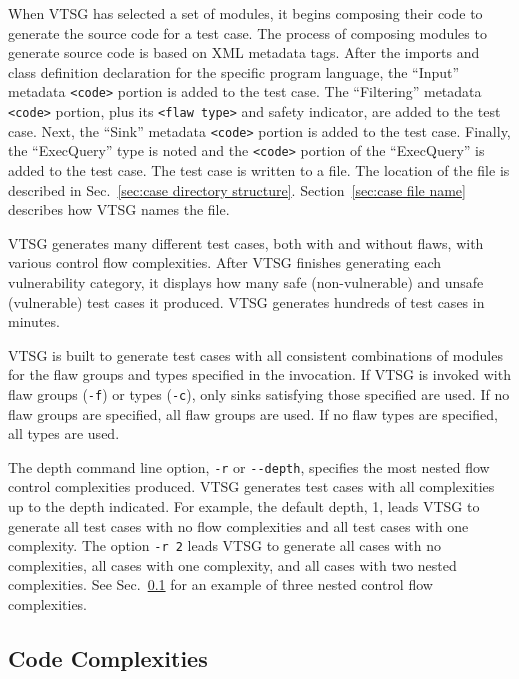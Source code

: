 \documentclass[12pt]{article}
\begin{document}
When VTSG has selected a set of modules, it begins composing
their code to generate the source code for a test case.
The process of composing modules to generate source code is
based on XML metadata tags.
After the imports and class definition declaration for the 
specific program
language, the ``Input'' metadata \verb|<code>| portion
is added to the test case.  
The ``Filtering'' metadata \verb|<code>| portion, plus its
\verb|<flaw type>| and safety indicator, are added to
the test case.  Next, the ``Sink'' metadata 
\verb|<code>| portion
is added to the test case.  Finally, the ``ExecQuery'' type is 
noted and the 
\verb|<code>| portion of the ``ExecQuery'' is added
to the 
test case.  The test case is written to a file.  
The location of the file is
described in Sec.~\ref{sec:case directory structure}.
Section~\ref{sec:case file name} describes how VTSG names the file.

VTSG generates many different test cases, both with and without
flaws, with various control flow complexities.  After VTSG finishes
generating each vulnerability category, it displays how many safe (non-vulnerable)
and unsafe (vulnerable) test cases it produced.
VTSG generates hundreds of test cases in minutes.

VTSG is built to generate test cases with all consistent combinations
of modules for the flaw groups and types specified in the invocation.
If VTSG is invoked with flaw groups (\verb|-f|) or types (\verb|-c|),
only sinks satisfying those specified are used.
If no flaw groups are specified, all flaw groups are used.  
If no flaw types are specified, all types are used.

\label{sec:depth of complexities}
The depth command line option, \verb|-r| or \verb|--depth|, 
specifies the
most nested flow control complexities produced.
VTSG generates test cases with all complexities up to the depth
indicated.
For example, the default depth, 1, leads VTSG to generate all
test cases with no flow complexities and all test cases with 
one complexity.  The option \verb|-r 2| leads VTSG to generate
all cases with no complexities, all cases with one complexity, 
and all cases with two nested complexities.
See Sec.~\ref{sec:code complexities} for an example of three 
nested control flow complexities.

\subsection{Code Complexities}
\label{sec:code complexities}
\end{document}
